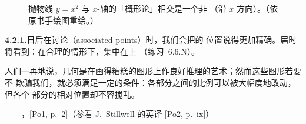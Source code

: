 \begin{figure}[htbp]
\centering
{}
\caption{抛物线 $y=x^2$ 与 $x$-轴的「概形论」相交是一个非\trReduced{}\trScheme%
（\trFuzz{}沿 $x$ 方向）。（依原书手绘图重绘。）}%
\label{fig:scheme-theoretic-intersection}
\end{figure}

\textbf{4.2.1.}\quad 日后在讨论\trAssociatedPoint{}（associated points）时，我们会把\trFuzz{}的
位置说得更加精确。届时将看到：在合理的情形下，\trFuzz{}集中在\trClosedSubset{}上
（练习~6.6.N）。

\epigraph
  {人们一再地说，几何是在画得糟糕的图形上作良好推理的艺术；然而这些图形若要不
   欺骗我们，就必须满足一定的条件：各部分之间的比例可以被大幅度地改动，但各个
   部分的相对位置却不容搅乱。}
  {——，[Po1, p.~2]（参看 J.~Stillwell 的英译
   [Po2, p.~ix]）}
